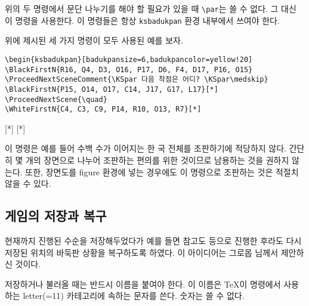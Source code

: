 \documentclass[figtabcapt,a4paper]{oblivoir}
\begin{document}
\begin{boxedverbatim}
\KSpar
\end{boxedverbatim}

위의 두 명령에서 문단 나누기를 해야 할 필요가 있을 때 \verb|\par|는 쓸 수 없다. 그 대신
이 명령을 사용한다. 이 명령들은 항상 \texttt{ksbadukpan} 환경 내부에서 쓰여야 한다.

위에 제시된 세 가지 명령이 모두 사용된 예를 보자.

\begin{verbatim}
\begin{ksbadukpan}[badukpansize=6,badukpancolor=yellow!20]
\BlackFirstN{R16, Q4, D3, O16, P17, D6, F4, D17, P16, O15}
\ProceedNextSceneComment{\KSpar 다음 착점은 어디? \KSpar\medskip}
\BlackFirstN{P15, O14, O17, C14, J17, G17, L17}[*]
\ProceedNextScene{\quad}
\WhiteFirstN{C4, C3, C9, P14, R10, O13, R7}[*]
\end{verbatim}

\begin{ksbadukpan}[badukpansize=6,badukpancolor=yellow!20]
[*]
\ProceedNextScene{\quad}
[*]
\end{ksbadukpan}

\bigskip

이 명령은 예를 들어 수백 수가 이어지는 한 국 전체를 조판하기에 적당하지 않다.
간단히 몇 개의 장면으로 나누어 조판하는 편의를 위한 것이므로 남용하는 것을 권하지 않는다.
또한, 장면도를 figure 환경에 넣는 경우에도 이 명령으로 조판하는 것은 적절치 않을 수 있다.


\subsection{게임의 저장과 복구}

현재까지 진행된 수순을 저장해두었다가 예를 들면 참고도 등으로 진행한 후라도
다시 저장된 위치의 바둑판 상황을 복구하도록 하였다. 이 아이디어는 그로몹 님께서 제안하신 것이다.

\begin{boxedverbatim}
\end{boxedverbatim}

저장하거나 불러올 때는 반드시 이름을 붙여야 한다. 이 이름은 \TeX 이 명령에서 사용하는 letter(=11) 카테고리에 속하는 문자를 쓴다. 숫자는 쓸 수 없다. 
\end{document}
